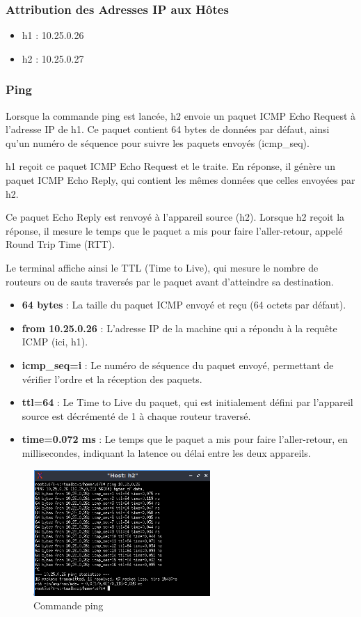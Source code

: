 \subsubsection{Attribution des Adresses IP aux Hôtes}
\begin{itemize}
    \item h1 : 10.25.0.26
    \item h2 : 10.25.0.27
\end{itemize}


\subsubsection{Ping}
Lorsque la commande ping est lancée, h2 envoie un paquet ICMP Echo Request à l'adresse IP de h1. Ce paquet contient 64 bytes de données par défaut, ainsi qu'un numéro de séquence pour suivre les paquets envoyés (icmp\_seq).

h1 reçoit ce paquet ICMP Echo Request et le traite. En réponse, il génère un paquet ICMP Echo Reply, qui contient les mêmes données que celles envoyées par h2.

Ce paquet Echo Reply est renvoyé à l'appareil source (h2). Lorsque h2 reçoit la réponse, il mesure le temps que le paquet a mis pour faire l'aller-retour, appelé Round Trip Time (RTT).

Le terminal affiche ainsi le TTL (Time to Live), qui mesure le nombre de routeurs ou de sauts traversés par le paquet avant d'atteindre sa destination.
\begin{itemize}
    \item \textbf{64 bytes} : La taille du paquet ICMP envoyé et reçu (64 octets par défaut).
    \item \textbf{from 10.25.0.26} : L'adresse IP de la machine qui a répondu à la requête ICMP (ici, h1).
    \item \textbf{icmp\_seq=i} : Le numéro de séquence du paquet envoyé, permettant de vérifier l'ordre et la réception des paquets.
    \item \textbf{ttl=64} : Le Time to Live du paquet, qui est initialement défini par l'appareil source est décrémenté de 1 à chaque routeur traversé.
    \item \textbf{time=0.072 ms} : Le temps que le paquet a mis pour faire l’aller-retour, en millisecondes, indiquant la latence ou délai entre les deux appareils.
\end{itemize}
\begin{figure}[h]
    \centering
    \includegraphics[width=0.6\textwidth]{./images/ping.png} 
    \caption{Commande ping}
    \label{fig:exemple}
\end{figure}
\newpage
